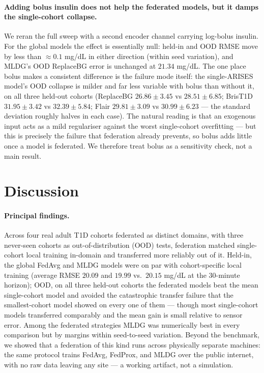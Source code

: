 \documentclass[10pt,letterpaper]{article}
\begin{document}
\paragraph{Adding bolus insulin does not help the federated models, but it damps
the single-cohort collapse.} We reran the full sweep with a second encoder
channel carrying log-bolus insulin. For the global models the effect is
essentially null: held-in and OOD RMSE move by less than $\approx 0.1$ mg/dL in
either direction (within seed variation), and MLDG's OOD ReplaceBG error is
unchanged at $21.34$ mg/dL. The one place bolus makes a consistent difference is
the failure mode itself: the single-ARISES model's OOD collapse is milder and far
less variable with bolus than without it, on all three held-out cohorts
(ReplaceBG $26.86 \pm 3.45$ vs $28.51 \pm 6.85$; BrisT1D $31.95 \pm 3.42$ vs
$32.39 \pm 5.84$; Flair $29.81 \pm 3.09$ vs $30.99 \pm 6.23$ --- the standard
deviation roughly halves in each case). The natural reading is that an exogenous
input acts as a mild regulariser against the worst single-cohort overfitting ---
but this is precisely the failure that federation already prevents, so bolus adds
little once a model is federated. We therefore treat bolus as a sensitivity
check, not a main result.

\section*{Discussion}

\paragraph{Principal findings.} Across four real adult T1D cohorts federated as
distinct domains, with three never-seen cohorts as out-of-distribution (OOD)
tests, federation matched single-cohort local training in-domain and transferred
more reliably out of it. Held-in, the global FedAvg and MLDG models were on par
with cohort-specific local training (average RMSE $20.09$ and $19.99$ vs.\
$20.15$ mg/dL at the 30-minute horizon); OOD, on all three held-out cohorts the
federated models beat the mean single-cohort model and avoided the catastrophic
transfer failure that the smallest-cohort model showed on every one of them ---
though most single-cohort models transferred comparably and the mean gain is
small relative to sensor error. Among the federated strategies MLDG was
numerically best in every comparison but by margins within seed-to-seed
variation. Beyond the benchmark, we showed that a federation of this kind runs
across physically separate machines: the same protocol trains FedAvg, FedProx,
and MLDG over the public internet, with no raw data leaving any site --- a working
artifact, not a simulation.
\end{document}
